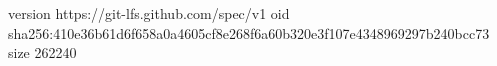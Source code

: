 version https://git-lfs.github.com/spec/v1
oid sha256:410e36b61d6f658a0a4605cf8e268f6a60b320e3f107e4348969297b240bcc73
size 262240
